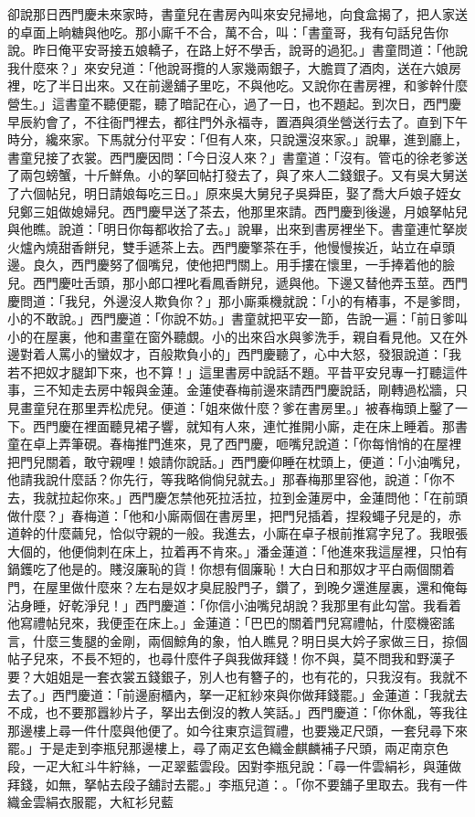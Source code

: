 卻說那日西門慶未來家時，書童兒在書房內叫來安兒掃地，向食盒揭了，把人家送的卓面上晌糖與他吃。那小廝千不合，萬不合，叫：「書童哥，我有句話兒告你說。昨日俺平安哥接五娘轎子，在路上好不學舌，說哥的過犯。」書童問道：「他說我什麼來？」來安兒道：「他說哥攬的人家幾兩銀子，大膽買了酒肉，送在六娘房裡，吃了半日出來。又在前邊舖子里吃，不與他吃。又說你在書房裡，和爹幹什麼營生。」這書童不聽便罷，聽了暗記在心，過了一日，也不題起。到次日，西門慶早辰約會了，不往衙門裡去，都往門外永福寺，置酒與須坐營送行去了。直到下午時分，纔來家。下馬就分付平安：「但有人來，只說還沒來家。」說畢，進到廳上，書童兒接了衣裳。西門慶因問：「今日沒人來？」書童道：「沒有。管屯的徐老爹送了兩包螃蟹，十斤鮮魚。小的拏回帖打發去了，與了來人二錢銀子。又有吳大舅送了六個帖兒，明日請娘每吃三日。」原來吳大舅兒子吳舜臣，娶了喬大戶娘子姪女兒鄭三姐做媳婦兒。西門慶早送了茶去，他那里來請。西門慶到後邊，月娘拏帖兒與他瞧。說道：「明日你每都收拾了去。」說畢，出來到書房裡坐下。書童連忙拏炭火爐內燒甜香餅兒，雙手遞茶上去。西門慶擎茶在手，他慢慢挨近，站立在卓頭邊。良久，西門慶努了個嘴兒，使他把門關上。用手摟在懷里，一手捧着他的臉兒。西門慶吐舌頭，那小郎口裡叱看鳳香餅兒，遞與他。下邊又替他弄玉莖。西門慶問道：「我兒，外邊沒人欺負你？」那小廝乘機就說：「小的有樁事，不是爹問，小的不敢說。」西門慶道：「你說不妨。」書童就把平安一節，告說一遍：「前日爹叫小的在屋裏，他和畫童在窗外聽覷。小的出來舀水與爹洗手，親自看見他。又在外邊對着人罵小的蠻奴才，百般欺負小的」西門慶聽了，心中大怒，發狠說道：「我若不把奴才腿卸下來，也不算！」這里書房中說話不題。平昔平安兒專一打聽這件事，三不知走去房中報與金蓮。金蓮使春梅前邊來請西門慶說話，剛轉過松牆，只見畫童兒在那里弄松虎兒。便道：「姐來做什麼？爹在書房里。」被春梅頭上鑿了一下。西門慶在裡面聽見裙子響，就知有人來，連忙推開小廝，走在床上睡着。那書童在卓上弄筆硯。春梅推門進來，見了西門慶，咂嘴兒說道：「你每悄悄的在屋裡把門兒關着，敢守親哩！娘請你說話。」西門慶仰睡在枕頭上，便道：「小油嘴兒，他請我說什麼話？你先行，等我略倘倘兒就去。」那春梅那里容他，說道：「你不去，我就拉起你來。」西門慶怎禁他死拉活拉，拉到金蓮房中，金蓮問他：「在前頭做什麼？」春梅道：「他和小廝兩個在書房里，把門兒插着，捏殺蠅子兒是的，赤道幹的什麼繭兒，恰似守親的一般。我進去，小廝在卓子根前推寫字兒了。我眼張大個的，他便倘刺在床上，拉着再不肯來。」潘金蓮道：「他進來我這屋裡，只怕有鍋鑊吃了他是的。賤沒廉恥的貨！你想有個廉恥！大白日和那奴才平白兩個關着門，在屋里做什麼來？左右是奴才臭屁股門子，鑽了，到晚夕還進屋裏，還和俺每沾身睡，好乾淨兒！」西門慶道：「你信小油嘴兒胡說？我那里有此勾當。我看着他寫禮帖兒來，我便歪在床上。」金蓮道：「巴巴的關着門兒寫禮帖，什麼機密謠言，什麼三隻腿的金剛，兩個鯨角的象，怕人瞧見？明日吳大妗子家做三日，掠個帖子兒來，不長不短的，也尋什麼件子與我做拜錢！你不與，莫不問我和野漢子要？大姐姐是一套衣裳五錢銀子，別人也有簪子的，也有花的，只我沒有。我就不去了。」西門慶道：「前邊廚櫃內，拏一疋紅紗來與你做拜錢罷。」金蓮道：「我就去不成，也不要那囂紗片子，拏出去倒沒的教人笑話。」西門慶道：「你休亂，等我往那邊樓上尋一件什麼與他便了。如今往東京這賀禮，也要幾疋尺頭，一套兒尋下來罷。」于是走到李瓶兒那邊樓上，尋了兩疋玄色織金麒麟補子尺頭，兩疋南京色段，一疋大紅斗牛紵絲，一疋翠藍雲段。因對李瓶兒說：「尋一件雲絹衫，與蓮做拜錢，如無，拏帖去段子舖討去罷。」李瓶兒道：。「你不要舖子里取去。我有一件織金雲絹衣服罷，大紅衫兒藍